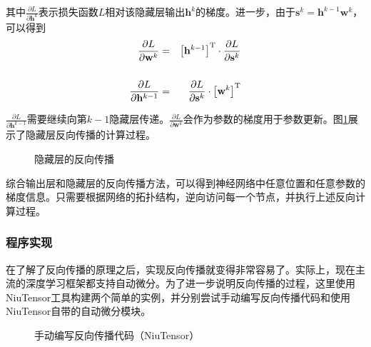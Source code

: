 \noindent  其中$ \frac{\partial L}{\partial \mathbf h^k} $表示损失函数$ L $相对该隐藏层输出$ \mathbf h^k $的梯度。进一步，由于$ \mathbf s^k =\mathbf h^{k-1}\mathbf w^k$，可以得到
\begin{eqnarray}
\frac{\partial L}{\partial \mathbf w^k}&=&{\left[\mathbf h^{k-1}\right]}^{\rm T}\cdot \frac{\partial L}{\partial \mathbf s^k}\label{eq:5-55}\\ \nonumber\\
\frac{\partial L}{\partial \mathbf h^{k-1}}&= &\frac{\partial L}{\partial \mathbf s^k} \cdot {\left[\mathbf w^k\right]}^{\rm T}
\label{eq:5-56}
\end{eqnarray}

\parinterval  $ \frac{\partial L}{\partial \mathbf h^{k-1}} $需要继续向第$ k-1 $隐藏层传递。$ \frac{\partial L}{\partial \mathbf w^k} $会作为参数的梯度用于参数更新。图\ref{fig:5-57}展示了隐藏层反向传播的计算过程。

\begin{figure}[htp]
\centering

\caption{隐藏层的反向传播}
\label{fig:5-57}
\end{figure}

\parinterval  综合输出层和隐藏层的反向传播方法，可以得到神经网络中任意位置和任意参数的梯度信息。只需要根据网络的拓扑结构，逆向访问每一个节点，并执行上述反向计算过程。


\subsubsection{程序实现}

\parinterval  在了解了反向传播的原理之后，实现反向传播就变得非常容易了。实际上，现在主流的深度学习框架都支持自动微分。为了进一步说明反向传播的过程，这里使用NiuTensor工具构建两个简单的实例，并分别尝试手动编写反向传播代码和使用NiuTensor自带的自动微分模块。

\begin{figure}[htp]
\centering

\caption{手动编写反向传播代码（NiuTensor）}
\label{fig:5-58}
\end{figure}

